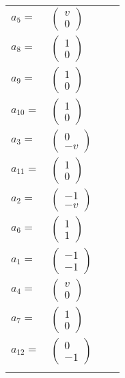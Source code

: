 \documentclass[1p]{elsarticle_modified}
\theoremstyle{definition}
\begin{document}
\begin{tabular}{m{7pt} m{180pt} m{7pt} m{180pt} }
\flushright $a_{5}=$&$\begin{pmatrix}v\\0\end{pmatrix}$ \\
\flushright $a_{8}=$&$\begin{pmatrix}1\\0\end{pmatrix}$ \\
\flushright $a_{9}=$&$\begin{pmatrix}1\\0\end{pmatrix}$ \\
\flushright $a_{10}=$&$\begin{pmatrix}1\\0\end{pmatrix}$ \\
\flushright $a_{3}=$&$\begin{pmatrix}0\\- v\end{pmatrix}$ \\
\flushright $a_{11}=$&$\begin{pmatrix}1\\0\end{pmatrix}$ \\
\flushright $a_{2}=$&$\begin{pmatrix}-1\\- v\end{pmatrix}$ \\
\flushright $a_{6}=$&$\begin{pmatrix}1\\1\end{pmatrix}$ \\
\flushright $a_{1}=$&$\begin{pmatrix}-1\\-1\end{pmatrix}$ \\
\flushright $a_{4}=$&$\begin{pmatrix}v\\0\end{pmatrix}$ \\
\flushright $a_{7}=$&$\begin{pmatrix}1\\0\end{pmatrix}$ \\
\flushright $a_{12}=$&$\begin{pmatrix}0\\-1\end{pmatrix}$\\&\end{tabular}
\end{document}
